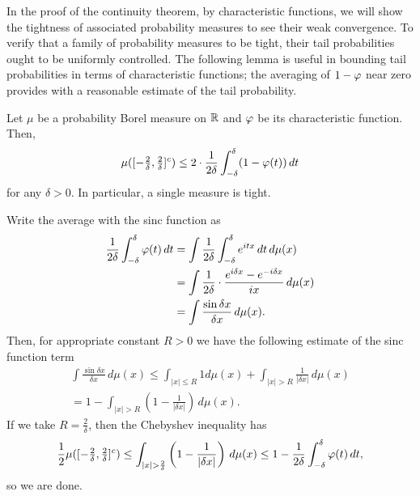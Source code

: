 \documentclass[a4paper]{article}
\begin{document}
In the proof of the continuity theorem, by characteristic functions, we will show the tightness of associated probability measures to see their weak convergence.
To verify that a family of probability measures to be tight, their tail probabilities ought to be uniformly controlled.
The following lemma is useful in bounding tail probabilities in terms of characteristic functions; the averaging of $1-\varphi$ near zero provides with a reasonable estimate of the tail probability.

\begin{lem}
Let $\mu$ be a probability Borel measure on $\mathbb{R}$ and $\varphi$ be its characteristic function.
Then,
\[\mu([-\tfrac2\delta,\tfrac2\delta]^c)\le2\cdot\frac1{2\delta}\int_{-\delta}^\delta(1-\varphi(t))\,dt\]
for any $\delta>0$.
In particular, a single measure is tight.
\end{lem}
\begin{pf}
Write the average with the sinc function as
\begin{align*}
\frac1{2\delta}\int_{-\delta}^\delta\varphi(t)\,dt
&=\int\frac1{2\delta}\int_{-\delta}^\delta e^{itx}\,dt\,d\mu(x)\\
&=\int\frac1{2\delta}\cdot\frac{e^{i\delta x}-e^{-i\delta x}}{ix}\,d\mu(x)\\
&=\int\frac{\sin\delta x}{\delta x}\,d\mu(x).
\end{align*}
Then, for appropriate constant $R>0$ we have the following estimate of the sinc function term
\begin{align*}
\int\frac{\sin\delta x}{\delta x}\,d\mu(x)
\le\int_{|x|\le R}1d\mu(x)+\int_{|x|>R}\frac1{|\delta x|}\,d\mu(x)\\
=1-\int_{|x|>R}\left(1-\frac1{|\delta x|}\right)\,d\mu(x).
\end{align*}
If we take $R=\frac2\delta$, then the Chebyshev inequality has
\[\frac12\mu([-\tfrac2\delta,\tfrac2\delta]^c)\le\int_{|x|>\frac2\delta}\left(1-\frac1{|\delta x|}\right)\,d\mu(x)\le1-\frac1{2\delta}\int_{-\delta}^\delta\f(t)\,dt,\]
so we are done.
\end{pf}
\end{document}
